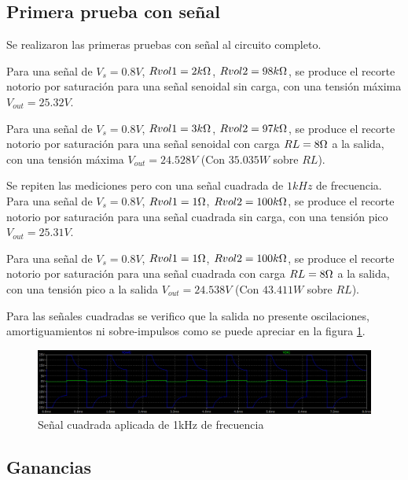 \subsection{Primera prueba con señal}

\par Se realizaron las primeras pruebas con señal al circuito completo.\\

\par Para una señal de $V_s = 0.8V$, $Rvol1 =2k\ohm$, $Rvol2 = 98k\ohm$, se produce el recorte notorio por saturación para una señal senoidal sin carga, con una tensión máxima $V_{out} = 25.32V$.

Para una señal de $V_s = 0.8V$, $Rvol1 =3k\ohm$, $Rvol2 = 97k\ohm$, se produce el recorte notorio por saturación para una señal senoidal con carga $RL=8\ohm$ a la salida, con una tensión máxima $V_{out} = 24.528V$ (Con $35.035W$ sobre $RL$).\\

\par Se repiten las mediciones pero con una señal cuadrada de $1kHz$ de frecuencia. Para una señal de $V_s = 0.8V$, $Rvol1 =1\ohm$, $Rvol2 = 100k\ohm$, se produce el recorte notorio por saturación para una señal cuadrada sin carga, con una tensión pico $V_{out} = 25.31V$.

Para una señal de $V_s = 0.8V$, $Rvol1 =1\ohm$, $Rvol2 = 100k\ohm$, se produce el recorte notorio por saturación para una señal cuadrada con carga $RL=8\ohm$ a la salida, con una tensión pico a la salida $V_{out} = 24.538V$ (Con $43.411W$ sobre $RL$).

Para las señales cuadradas se verifico que la salida no presente oscilaciones, amortiguamientos ni sobre-impulsos como se puede apreciar en la figura \ref{fig::Cuadrada_a1khz}.\\

\begin{figure}[H]
        \centering
        \includegraphics[scale=0.5]{./Cuadrada_a1khz.png}
        \caption{Señal cuadrada aplicada de 1kHz de frecuencia}
        \label{fig::Cuadrada_a1khz}
\end{figure}


\subsection{Ganancias}

